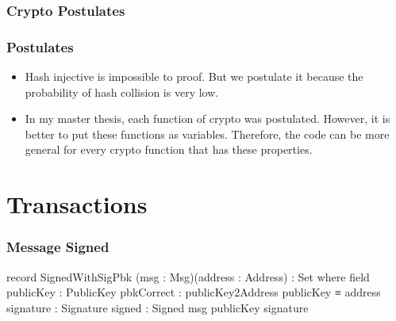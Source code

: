 \documentclass{beamer}
\begin{document}
\begin{frame}
  \frametitle{Crypto Postulates}
\end{frame}

\begin{frame}
  \frametitle{Postulates}
  \begin{itemize}
    \item Hash injective is impossible to proof.
      But we postulate it because the probability of hash collision is very low.
    \item In my master thesis, each function of crypto was postulated.
      However, it is better to put these functions as variables.
      Therefore, the code can be more general for every crypto function that has these properties.
  \end{itemize}
\end{frame}

\section{Transactions}

\begin{frame}
  \frametitle{Message Signed}
\begin{code}
    record SignedWithSigPbk (msg : Msg)(address : Address)
      : Set where
      field
        publicKey   :  PublicKey
        pbkCorrect  :  publicKey2Address publicKey ≡ address
        signature   :  Signature
        signed      :  Signed msg publicKey signature

\end{code}
\end{frame}
\end{document}
